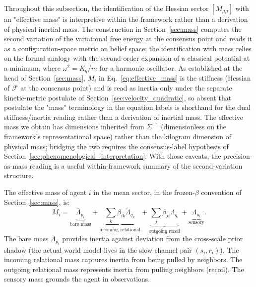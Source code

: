 \documentclass[11pt]{article}
\begin{document}
Throughout this subsection, the identification of the Hessian sector $[M_{\mu\mu}]$ with an "effective mass" is interpretive within the framework rather than a derivation of physical inertial mass. The construction in Section~\ref{sec:mass} computes the second variation of the variational free energy at the consensus point and reads it as a configuration-space metric on belief space; the identification with mass relies on the formal analogy with the second-order expansion of a classical potential at a minimum, where $\omega^2 = K_q/m$ for a harmonic oscillator. As established at the head of Section~\ref{sec:mass}, $M_i$ in Eq.~\eqref{eq:effective_mass} is the stiffness (Hessian of $\mathcal{F}$ at the consensus point) and is read as inertia only under the separate kinetic-metric postulate of Section~\ref{sec:velocity_quadratic}, so absent that postulate the "mass" terminology in the equation labels is shorthand for the dual stiffness/inertia reading rather than a derivation of inertial mass. The effective mass we obtain has dimensions inherited from $\Sigma^{-1}$ (dimensionless on the framework's representational space) rather than the kilogram dimension of physical mass; bridging the two requires the consensus-label hypothesis of Section~\ref{sec:phenomenological_interpretation}. With those caveats, the precision-as-mass reading is a useful within-framework summary of the second-variation structure.

The effective mass of agent $i$ in the mean sector, in the frozen-$\beta$ convention of Section~\ref{sec:mass}, is:
\begin{equation}
M_i = \underbrace{\bar{\Lambda}_{p_i}}_{\text{bare mass}} + \underbrace{\sum_k \beta_{ik}\tilde{\Lambda}_{q_k}}_{\text{incoming relational}} + \underbrace{\sum_j \beta_{ji}\Lambda_{q_i}}_{\text{outgoing recoil}} + \underbrace{\Lambda_{o_i}}_{\text{sensory}}.
\label{eq:effective_mass}
\end{equation}
The bare mass $\bar{\Lambda}_{p_i}$ provides inertia against deviation from the cross-scale prior shadow (the actual world-model lives in the slow-channel pair $(s_i, r_i)$). The incoming relational mass captures inertia from being pulled by neighbors. The outgoing relational mass represents inertia from pulling neighbors (recoil). The sensory mass grounds the agent in observations.
\end{document}
